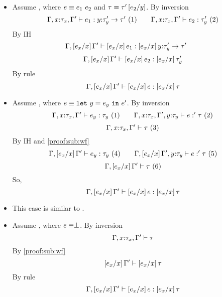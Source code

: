 \begin{enumerate}
\begin{itemize}
\item\rtapp Assume ,
where $e\equiv\eapp{e_1}{e_2}$ and $\tau\equiv\tau'\sub{y}{e_2}$.
By inversion
	$$
	\hastype{\Gamma, x\colon\tau_x, \Gamma'}{e_1}{\tfun{y}{\tau'_y}{\tau'}}\ (1)\qquad
	\hastype{\Gamma, x\colon\tau_x, \Gamma'}{e_2}{{\tau'_y}}\ (2)
	$$
By IH 
	$$
	\hastype{\Gamma,\sub{x}{e_x} \Gamma'}{\sub{x}{e_x}e_1}{\sub{x}{e_x}\tfun{y}{\tau'_y}{\tau'}} \qquad
	$$
	$$
	\hastype{\Gamma,\sub{x}{e_x} \Gamma'}{\sub{x}{e_x}e_2}{\sub{x}{e_x}{\tau'_y}}
	$$
	By rule \rtapp
	$$
	\hastype{\Gamma,\sub{x}{e_x} \Gamma'}{\sub{x}{e_x}e}{\sub{x}{e_x}\tau}
	$$

\item\rtlet Assume ,
where $e\equiv\elet{y}{e_y}{e'}$.
By inversion
	$$
	\hastype{\Gamma, x\colon\tau_x, \Gamma'}{e_y}{\tau_y}\ (1) \qquad
	\hastype{\Gamma, x\colon\tau_x, \Gamma', y\colon\tau_y}{e}'{\tau}\ (2)
	$$
	$$
	\iswellformed{\Gamma, x\colon\tau_x, \Gamma'}{\tau}\ (3)
	$$
By IH and \ref{proof:sub:wf}	
	$$
	\hastype{\Gamma, \sub{x}{e_x}\Gamma'}{e_y}{\tau_y}\ (4) \qquad
	\hastype{\Gamma, \sub{x}{e_x}\Gamma', y\colon\tau_y}{e}'{\tau}\ (5)
	$$
	$$
	\iswellformed{\Gamma, \sub{x}{e_x}\Gamma'}{\tau}\ (6)
	$$
So, 	$$
	\hastype{\Gamma,\sub{x}{e_x} \Gamma'}{\sub{x}{e_x}e}{\sub{x}{e_x}\tau}
	$$

\item\rtcase This case is similar to \rtlet.
\item\rtbot Assume ,
where $e\equiv\ebot$.
By inversion
$$	\iswellformed{\Gamma, x\colon\tau_x, \Gamma'}{\tau}$$
By \ref{proof:sub:wf}
$$	\iswellformed{\sub{x}{e_x}\Gamma'}{\sub{x}{e_x}\tau}$$
By rule \rtbot
	$$
	\hastype{\Gamma,\sub{x}{e_x} \Gamma'}{\sub{x}{e_x}e}{\sub{x}{e_x}\tau}
	$$
\end{itemize}





\end{enumerate}
